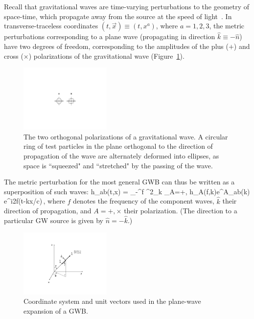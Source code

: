 Recall that gravitational waves are time-varying 
perturbations to the geometry of space-time, 
which propagate away from the source at the speed 
of light~\cite{MTW:1973, Hartle:2002}.
In transverse-traceless coordinates
$(t,\vec x)\equiv (t,x^a)$, where $a=1,2,3$,
the metric perturbations corresponding to a 
plane wave (propagating in direction $\hat k\equiv-\hat n$) 
have two degrees of freedom, corresponding to the 
amplitudes of the 
plus ($+$) and cross ($\times$) polarizations of
the gravitational wave (Figure~\ref{f:polarizations}).
%
\begin{figure}[htbp!]
\begin{center}
\includegraphics[width=0.4\textwidth]{Figures/polarizations}
\caption{The two orthogonal polarizations of a gravitational wave.
A circular ring of test particles in the plane orthogonal to 
the direction of propagation of the wave are alternately deformed
into ellipses, as space is ``squeezed" and ``stretched" by the 
passing of the wave.}
\label{f:polarizations}
\end{center}
\end{figure}
%
The metric perturbation for the most general GWB 
can thus be written as a superposition of such 
waves:
%
\be
h_{ab}(t,\vec x) =
\int_{-\infty}^\infty \D f\>
\int \D^2\Omega_{\hat k}\>
\sum_{A=+,\times}
h_A(f,\hat k)e^A_{ab}(\hat k) 
e^{i2\pi f(t-\hat k\cdot \vec x/c)}\,,
\label{e:planewave}
\ee
%
where $f$ denotes the frequency of the 
component waves, $\hat k$ their direction of
propagation, and $A=+,\times$ their polarization.
(The direction to a particular GW source is given 
by $\hat n=-\hat k$.)
%
\begin{figure}[htbp!]
\begin{center}
\includegraphics[width=0.4\textwidth]{Figures/plane_wave}
\caption{Coordinate system and unit vectors used in the 
plane-wave expansion of a GWB.}
\label{f:plane_wave}
\end{center}
\end{figure}
